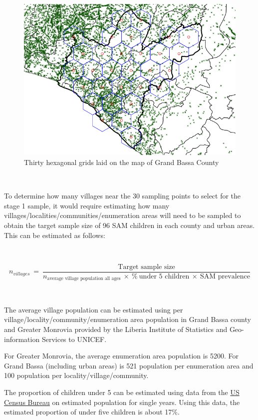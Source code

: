 \documentclass[12pt,a4paper]{book}
\theoremstyle{definition}
\theoremstyle{definition}
\theoremstyle{definition}
\theoremstyle{remark}
\begin{document}
~

\begin{figure}[H]

{\centering \includegraphics{figures/sample23-1} 

}

\caption{Thirty hexagonal grids laid on the  map of Grand Bassa County}\label{fig:sample23}
\end{figure}

~

To determine how many villages near the 30 sampling points to select for
the stage 1 sample, it would require estimating how many
villages/localities/communities/enumeration areas will need to be
sampled to obtain the target sample size of 96 SAM children in each
county and urban areas. This can be estimated as follows:

~

\[ n_{villages} ~ = ~ \frac{\text{Target sample size}}{n_{\text{average village population all ages}} ~ \times ~ \% ~ \text{under 5 children} ~ \times ~ \text{SAM prevalence}} \]

~

The average village population can be estimated using per
village/locality/community/enumeration area population in Grand Bassa
county and Greater Monrovia provided by the Liberia Institute of
Statistics and Geo-information Services to UNICEF.

For Greater Monrovia, the average enumeration area population is 5200.
For Grand Bassa (including urban areas) is 521 population per
enumeration area and 100 population per locality/village/community.

The proportion of children under 5 can be estimated using data from the
\href{https://www.census.gov/data-tools/demo/idb/region.php?N=\%20Results\%20\&T=15\&A=separate\&RT=0\&Y=2018\&R=-1\&C=LI}{US
Census Bureau} on estimated population for single years. Using this
data, the estimated proportion of under five children is about 17\%.
\end{document}
